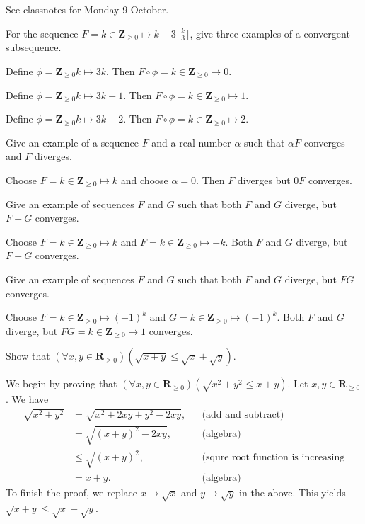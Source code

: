 \documentclass[12pt, fleqn, answers]{exam}
\newcommand{\reals}{\mathbf{R}}
\newcommand{\integers}{\mathbf{Z}}
\begin{document}
\begin{questions}
\begin{solution}
See classnotes for Monday 9 October.
\end{solution}

\question For the sequence $F  = k \in \integers_{\geq 0} \mapsto k - 3 \lfloor \frac{k}{3} \rfloor $, give three examples of
a convergent subsequence.

\begin{solution}  Define $\phi = \integers_{\geq 0} k \mapsto  3 k$.
  Then $F \circ \phi = k \in \integers_{\geq 0} \mapsto 0$.

  Define $\phi = \integers_{\geq 0} k \mapsto  3 k + 1$.
  Then $F \circ \phi = k \in \integers_{\geq 0} \mapsto 1$.

  Define $\phi = \integers_{\geq 0} k \mapsto  3 k + 2$.
  Then $F \circ \phi = k \in \integers_{\geq 0} \mapsto 2$.

  
\end{solution}

\question Give an example of a sequence $F$ and a real number $\alpha$ such that $\alpha F$ converges and $F$ diverges.
\begin{solution} Choose $F = k \in \integers_{\geq 0} \mapsto k$ and choose $\alpha = 0$. Then $F$ diverges but $0F$ 
converges.
\end{solution}
 \question Give an example of sequences $F$ and $G$ such that both $F$ and $G$ diverge, but $F+ G$ converges.
 \begin{solution} Choose $F = k \in \integers_{\geq 0} \mapsto k$ and $F = k \in \integers_{\geq 0} \mapsto -k$.
 Both $F$ and $G$ diverge, but $F+G$ converges.
 \end{solution}
 
  \question Give an example of sequences $F$ and $G$ such that both $F$ and $G$ diverge, but $F G$ converges.
 \begin{solution} Choose $F = k \in \integers_{\geq 0} \mapsto (-1)^k$ and $G = k \in \integers_{\geq 0} \mapsto (-1)^k$.
 Both $F$ and $G$ diverge, but $F G =  k \in \integers_{\geq 0} \mapsto 1$ converges.
 \end{solution}
\question Show that $\left(\forall x,y \in \reals_{\geq 0}\right)(\sqrt{x+y} \leq \sqrt{x} +\sqrt{y})$.

\begin{solution} We begin by proving that $\left(\forall x,y \in \reals_{\geq 0}\right)(\sqrt{x^2 + y^2} \leq x + y) $.
Let $x,y \in \reals_{\geq 0}$. We have
\begin{align*}
\sqrt{x^2 + y^2} &= \sqrt{x^2 + 2 x y + y^2 - 2 x y}, &&\mbox{(add and subtract)} \\
                           &= \sqrt{(x + y)^2 - 2 x y}, &&\mbox{(algebra)} \\
                           &\leq \sqrt{(x + y)^2}, &&\mbox{(squre root function is increasing} \\
                           &= x + y.  &&\mbox{(algebra)} 
\end{align*}
To finish the proof, we replace $x \to \sqrt{x}$ and  $y \to \sqrt{y}$ in the above. This yields
$\sqrt{x+y} \leq \sqrt{x} + \sqrt{y}$.

\end{solution}
\end{questions}
\end{document}
